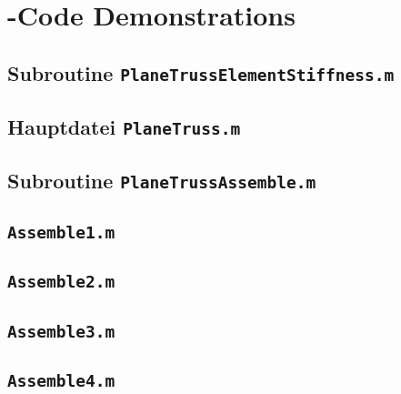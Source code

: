 \clearpage
\section*{\matl-Code Demonstrations}

\subsection*{Subroutine \tt PlaneTrussElementStiffness.m}





\subsection*{Hauptdatei \tt PlaneTruss.m}





\subsection*{Subroutine \tt PlaneTrussAssemble.m}



\subsection*{\tt Assemble1.m}



\subsection*{\tt Assemble2.m}



\subsection*{\tt Assemble3.m}



\subsection*{\tt Assemble4.m}





